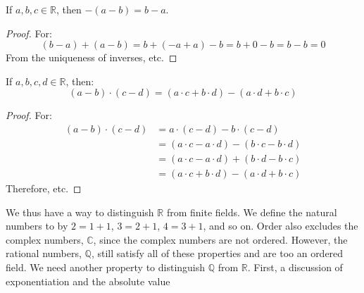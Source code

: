 \documentclass[crop=false,class=book,oneside]{standalone}
\begin{document}
            \begin{theorem}
                If $a,b,c\in\mathbb{R}$, then
                $\minus(a-b)=b-a$.
            \end{theorem}
            \begin{proof}
                For:
                \begin{equation}
                    (b-a)+(a-b)=b+(\minus{a}+a)-b=
                    b+0-b=b-b=0
                \end{equation}
                From the uniqueness of inverses, etc.
            \end{proof}
            \begin{theorem}
                If $a,b,c,d\in\mathbb{R}$, then:
                \begin{equation}
                    (a-b)\cdot(c-d)
                    =(a\cdot{c}+b\cdot{d})-(a\cdot{d}+b\cdot{c})
                \end{equation}
            \end{theorem}
            \begin{proof}
                For:
                \begin{subequations}
                    \begin{align}
                        (a-b)\cdot(c-d)&=
                        a\cdot(c-d)-b\cdot(c-d)\\
                        &=(a\cdot{c}-a\cdot{d})-
                            (b\cdot{c}-b\cdot{d})\\
                        &=(a\cdot{c}-a\cdot{d})+
                            (b\cdot{d}-b\cdot{c})\\
                        &=(a\cdot{c}+b\cdot{d})-
                            (a\cdot{d}+b\cdot{c})
                    \end{align}
                \end{subequations}
                Therefore, etc.
            \end{proof}
            We thus have a way to distinguish $\mathbb{R}$
            from finite fields. We define the natural numbers to by
            $2=1+1$, $3=2+1$, $4=3+1$, and so on. Order also excludes
            the complex numbers, $\mathbb{C}$, since the complex
            numbers are not ordered. However, the rational numbers,
            $\mathbb{Q}$, still satisfy all of these properties and
            are too an ordered field. We need another property to
            distinguish $\mathbb{Q}$ from $\mathbb{R}$. First, a
            discussion of exponentiation and the absolute value
\end{document}
